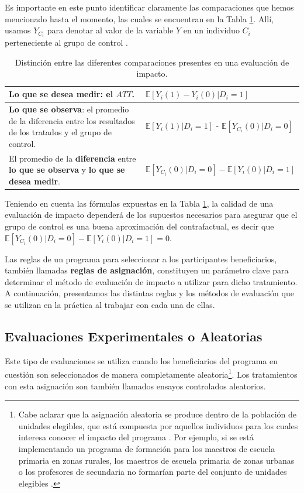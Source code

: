 \documentclass[../../main.tex]{subfiles}
\begin{document}
\bigskip
Es importante en este punto identificar claramente las comparaciones que hemos mencionado
hasta el momento, las cuales se encuentran en la Tabla \ref{tab:distinciones}. Allí,
usamos \(Y_{C_i}\) para denotar al valor de la variable \(Y\) en un individuo \(C_i\)
perteneciente al grupo de control .
\begin{table}[ht]
    \centering
    \begin{tabular}{p{7cm}m{7cm}}  %
        \hline
        \textbf{Lo que se desea medir}: el \(ATT\).
            & \(\mathbb{E} \left[Y_i(1)-Y_i(0)|D_i=1\right]\)
            \\
        \hline
        \textbf{Lo que se observa}: el promedio de la diferencia entre los resultados de
        los tratados y el grupo de control.
            & \(\mathbb{E} \left[Y_i(1)|D_i=1\right]\) - \(\mathbb{E} \left[Y_{C_i}(0)|D_i=0\right]\)
            \\
        \hline
        El promedio de la \textbf{diferencia} entre \textbf{lo que se observa} y
        \textbf{lo que se desea medir}.
            & \(\mathbb{E} \left[Y_{C_i}(0)|D_i=0\right] - \mathbb{E}\left[Y_i(0)|D_i=1\right]\)
        \\
        \hline
    \end{tabular}
    \caption{Distinción entre las diferentes comparaciones presentes en una evaluación de impacto.}
    \label{tab:distinciones}
\end{table}

Teniendo en cuenta las fórmulas expuestas en la Tabla \ref{tab:distinciones}, la calidad
de una evaluación de impacto dependerá de los supuestos necesarios para asegurar que el
grupo de control es una buena aproximación del contrafactual, es decir que \(\mathbb{E}
\left[Y_{C_i}(0)|D_i=0\right] - \mathbb{E}\left[Y_i(0)|D_i=1\right] = 0\).

\bigskip
Las reglas de un programa para seleccionar a los participantes beneficiarios, también
llamadas \textbf{reglas de asignación}, constituyen un parámetro clave para determinar el
método de evaluación de impacto a utilizar para dicho tratamiento. A continuación,
presentamos las distintas reglas y los métodos de evaluación que se utilizan en la
práctica al trabajar con cada una de ellas.

\subsection{Evaluaciones Experimentales o Aleatorias}
Este tipo de evaluaciones se utiliza cuando los beneficiarios del programa en cuestión son
seleccionados de manera completamente aleatoria\footnote{Cabe aclarar
que la asignación aleatoria se produce dentro de la población de unidades elegibles, que
está compuesta por aquellos individuos para los cuales interesa conocer el impacto del
programa \cite{gertler-2016}. Por ejemplo, si se está implementando un programa de
formación para los maestros de escuela primaria en zonas rurales, los maestros de escuela
primaria de zonas urbanas o los profesores de secundaria no formarían parte del conjunto
de unidades elegibles \cite{gertler-2016}.}. Los tratamientos con esta
asignación son también llamados ensayos controlados aleatorios.
\end{document}
